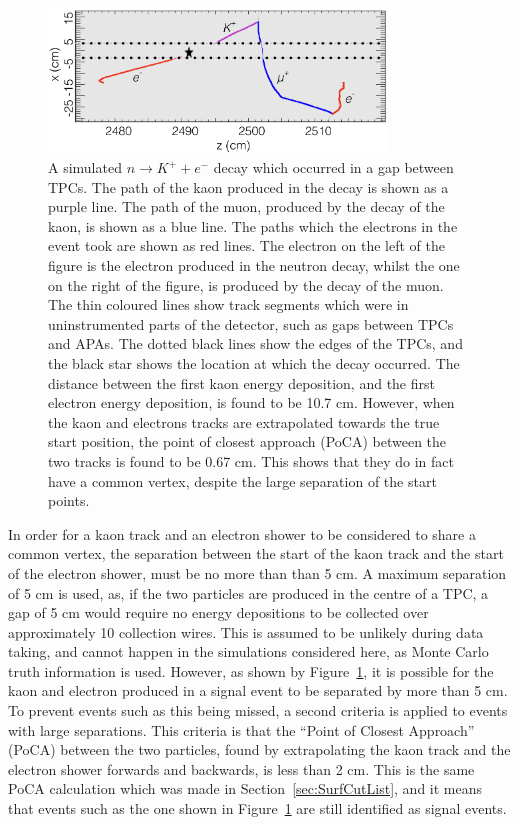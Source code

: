 \begin{figure}
  \centering
  \includegraphics[width=0.8\textwidth]{KaonElecBigGap}
  \caption[A simulated $n \rightarrow K^{+} + e^{-}$ decay which occurred in a gap between TPCs]
          {A simulated $n \rightarrow K^{+} + e^{-}$ decay which occurred in a gap between TPCs. The path of the kaon produced in the decay is shown as a purple line. The path of the muon, produced by the decay of the kaon, is shown as a blue line. The paths which the electrons in the event took are shown as red lines. The electron on the left of the figure is the electron produced in the neutron decay, whilst the one on the right of the figure, is produced by the decay of the muon. The thin coloured lines show track segments which were in uninstrumented parts of the detector, such as gaps between TPCs and APAs. The dotted black lines show the edges of the TPCs, and the black star shows the location at which the decay occurred. The distance between the first kaon energy deposition, and the first electron energy deposition, is found to be 10.7 cm. However, when the kaon and electrons tracks are extrapolated towards the true start position, the point of closest approach (PoCA) between the two tracks is found to be 0.67 cm. This shows that they do in fact have a common vertex, despite the large separation of the start points.} 
  \label{fig:NDK_Sig_KEBigGap}
\end{figure}

In order for a kaon track and an electron shower to be considered to share a common vertex, the separation between the start of the kaon track and the start of the electron shower, must be no more than than 5 cm. A maximum separation of 5 cm is used, as, if the two particles are produced in the centre of a TPC, a gap of 5 cm would require no energy depositions to be collected over approximately 10 collection wires. This is assumed to be unlikely during data taking, and cannot happen in the simulations considered here, as Monte Carlo truth information is used. However, as shown by Figure~\ref{fig:NDK_Sig_KEBigGap}, it is possible for the kaon and electron produced in a signal event to be separated by more than 5 cm. To prevent events such as this being missed, a second criteria is applied to events with large separations. This criteria is that the ``Point of Closest Approach'' (PoCA) between the two particles, found by extrapolating the kaon track and the electron shower forwards and backwards, is less than 2 cm. This is the same PoCA calculation which was made in Section~\ref{sec:SurfCutList}, and it means that events such as the one shown in Figure~\ref{fig:NDK_Sig_KEBigGap} are still identified as signal events. \\

